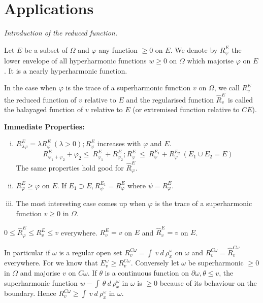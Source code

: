 \section{Applications}\label{p4:chap3:sec13}%

{\em Introduction of the reduced function.}

\begin{defn}\label{p4:chap3:sec13:def9} %
  Let $E$ be a subset of $\Omega$ and $\varphi$ any function $\ge 0$
  on $E$. We denote by $R^E_\varphi$ the lower envelope of all
  hyperharmonic functions $w \ge 0$ on $\Omega$ which majorise
  $\varphi$ on $E$. It is a nearly hyperharmonic function. 
\end{defn}

In the case when $\varphi$ is the trace of a superharmonic function
$v$ on $\Omega$, we call $R^E_v$ the reduced function of $v$ relative
to $E$ and the regularised function $\hat{R}^E_v$ is called the
balayaged function of $v$ relative to $E$ (or extremised function
relative to $CE$). 

\medskip
\noindent
\textbf{Immediate Properties:}\pageoriginale
\begin{enumerate}[(i)]
\item $R^E_{\lambda\varphi} = \lambda R^E_{\varphi} ~(\lambda > 0);
  R^E_\varphi$ increases with $\varphi$ and $E$. 
  $$
  R^E_{\varphi_1+\varphi_2} + \varphi_2 \le ~ R^E_{\varphi_1} + R^E_{\varphi_2};
  R^E_{\varphi} ~ \le ~ R^{E_1}_\varphi + R^{E_2}_\varphi ~ (E_1 \cup
  E_2 = E) 
  $$ 
  The same properties hold good for $\hat{R}^E_\varphi$.
  
\item $R^E_\varphi \ge \varphi$ on $E$. If $E_1 \supset E,
  R^{E_1}_\psi = R^E_\varphi$ where $\psi = R^E_\varphi$. 
\item The most interesting case comes up when $\varphi$ is the trace
  of a superharmonic function $v \ge 0$ in $\Omega$. 
\end{enumerate}

$0 \le \hat{R}^E_\varphi \le R^E_v \le v$ everywhere. $R^E_v = v$ on
$E$ and $\hat{R}^E_v = v$ on $E$. 

In particular if $\omega$ is a regular open set $R^{C\omega}_v = \int
~ v ~ d ~ \rho^\omega_x$ on $\omega$ and $R^{C\omega}_v = \hat{R}^{C
  \omega}_v$ everywhere. For we know that $E^\omega_v \ge R^{C
  \omega}_v$. Conversely let $\omega$ be superharmonic $\ge 0$ in
$\Omega$ and majorise $v$ on $C \omega$. If $\theta$ is a continuous
function on $\partial \omega, \theta \le v$, the superharmonic
function $w - \int ~ \theta ~ d ~ \rho^\omega_x $ in $\omega$ is $\ge
0$ because of its behaviour on the boundary. Hence $R^{C \omega}_v \ge
\int ~ v ~ d ~ \rho^\omega_x$ in $\omega$. 

